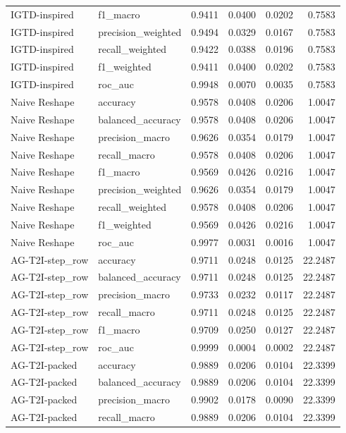 \begin{tabular}{llrrrr}
IGTD-inspired & f1_macro & 0.9411 & 0.0400 & 0.0202 & 0.7583 \\
IGTD-inspired & precision_weighted & 0.9494 & 0.0329 & 0.0167 & 0.7583 \\
IGTD-inspired & recall_weighted & 0.9422 & 0.0388 & 0.0196 & 0.7583 \\
IGTD-inspired & f1_weighted & 0.9411 & 0.0400 & 0.0202 & 0.7583 \\
IGTD-inspired & roc_auc & 0.9948 & 0.0070 & 0.0035 & 0.7583 \\
Naive Reshape & accuracy & 0.9578 & 0.0408 & 0.0206 & 1.0047 \\
Naive Reshape & balanced_accuracy & 0.9578 & 0.0408 & 0.0206 & 1.0047 \\
Naive Reshape & precision_macro & 0.9626 & 0.0354 & 0.0179 & 1.0047 \\
Naive Reshape & recall_macro & 0.9578 & 0.0408 & 0.0206 & 1.0047 \\
Naive Reshape & f1_macro & 0.9569 & 0.0426 & 0.0216 & 1.0047 \\
Naive Reshape & precision_weighted & 0.9626 & 0.0354 & 0.0179 & 1.0047 \\
Naive Reshape & recall_weighted & 0.9578 & 0.0408 & 0.0206 & 1.0047 \\
Naive Reshape & f1_weighted & 0.9569 & 0.0426 & 0.0216 & 1.0047 \\
Naive Reshape & roc_auc & 0.9977 & 0.0031 & 0.0016 & 1.0047 \\
AG-T2I-step_row & accuracy & 0.9711 & 0.0248 & 0.0125 & 22.2487 \\
AG-T2I-step_row & balanced_accuracy & 0.9711 & 0.0248 & 0.0125 & 22.2487 \\
AG-T2I-step_row & precision_macro & 0.9733 & 0.0232 & 0.0117 & 22.2487 \\
AG-T2I-step_row & recall_macro & 0.9711 & 0.0248 & 0.0125 & 22.2487 \\
AG-T2I-step_row & f1_macro & 0.9709 & 0.0250 & 0.0127 & 22.2487 \\
AG-T2I-step_row & roc_auc & 0.9999 & 0.0004 & 0.0002 & 22.2487 \\
AG-T2I-packed & accuracy & 0.9889 & 0.0206 & 0.0104 & 22.3399 \\
AG-T2I-packed & balanced_accuracy & 0.9889 & 0.0206 & 0.0104 & 22.3399 \\
AG-T2I-packed & precision_macro & 0.9902 & 0.0178 & 0.0090 & 22.3399 \\
AG-T2I-packed & recall_macro & 0.9889 & 0.0206 & 0.0104 & 22.3399 \\

\end{tabular}
